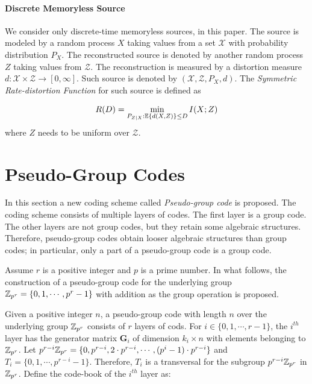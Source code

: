 \documentclass[conference]{IEEEtran}
\theoremstyle{plain}
\theoremstyle{definition}
\theoremstyle{remark}
\begin{document}
\paragraph{\textbf{Discrete Memoryless Source}}
We consider only discrete-time memoryless sources, in this paper. The source is modeled by a random process $X$ taking values from a set $\mathcal{X}$ with probability distribution $P_X$. The reconstructed source is denoted by another random process $Z$ taking values from $\mathcal{Z}$. The reconstruction is measured by a distortion measure $d: \mathcal{X} \times \mathcal{Z} \rightarrow [0,\infty]$. Such source is denoted by $(\mathcal{X}, \mathcal{Z}, P_X,d)$. The \textit{Symmetric Rate-distortion Function} for such source is defined as 

\begin{equation*}
R(D)=\min_{P_{Z|X}: \mathbb{E}\{d(X,Z)\}\leq D} I(X;Z)
\end{equation*}
where $Z$ needs to be uniform over $\mathcal{Z}$.



\section{Pseudo-Group Codes } \label{sec: pseudo+group}
In this section a new coding scheme called \textit{Pseudo-group code} is proposed. The coding scheme consists of multiple layers of codes. The first layer is a group code. The other layers are not group codes, but they retain some algebraic structures. Therefore, pseudo-group codes obtain looser algebraic structures than group codes; in particular, only a part of a pseudo-group code is a group code. 

Assume $r$ is a positive integer and $p$ is a prime number. In what follows, the construction of a pseudo-group code for the underlying group $\mathbb{Z}_{p^r}=\{0,1,\cdots, p^r-1\}$ with addition as the group operation is proposed.

Given a positive integer $n$, a pseudo-group code with length $n$ over the underlying group $\mathbb{Z}_{p^r}$ consists of $r$ layers of cods. For $i \in \{0,1,\cdots,r-1\}$, the $i^{th}$ layer has the generator matrix $\mathbf{G}_i$ of dimension $k_i\times n$ with elements belonging to $\mathbb{Z}_{p^r}$. Let $p^{r-i}\mathbb{Z}_{p^r}=\{0, p^{r-i}, 2\cdot p^{r-i}, \cdots, (p^{i}-1) \cdot p^{r-i}\}$ and $T_i=\{0,1,\cdots, p^{r-i}-1\}$. Therefore, $T_i$ is a transversal for the subgroup $p^{r-i}\mathbb{Z}_{p^r}$ in $\mathbb{Z}_{p^r}$. Define the code-book of the $i^{th}$ layer as: 
\end{document}
